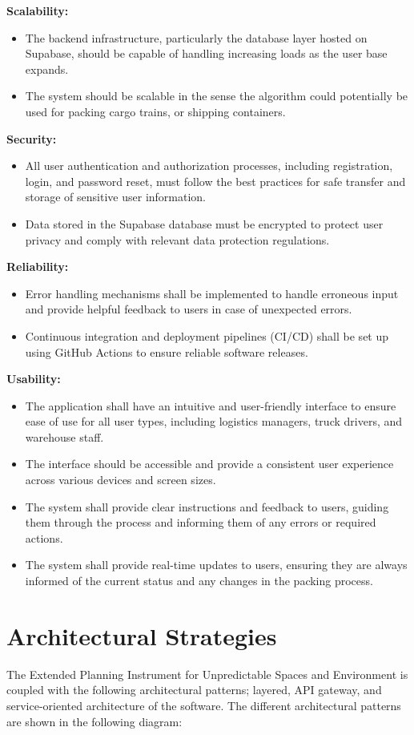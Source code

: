 \documentclass{article}
\begin{document}
\textbf{Scalability:}
\begin{itemize}
    \item The backend infrastructure, particularly the database layer hosted on Supabase, should be capable of handling increasing loads as the user base expands.
    \item The system should be scalable in the sense the algorithm could potentially be used for packing cargo trains, or shipping containers.
\end{itemize}

\textbf{Security:}
\begin{itemize}
    \item All user authentication and authorization processes, including registration, login, and password reset, must follow the best practices for safe transfer and storage of sensitive user information.
    \item Data stored in the Supabase database must be encrypted to protect user privacy and comply with relevant data protection regulations.
\end{itemize}

\textbf{Reliability:}
\begin{itemize}
    \item Error handling mechanisms shall be implemented to handle erroneous input and provide helpful feedback to users in case of unexpected errors.
    \item Continuous integration and deployment pipelines (CI/CD) shall be set up using GitHub Actions to ensure reliable software releases.
\end{itemize}

\textbf{Usability:}
\begin{itemize}
    \item The application shall have an intuitive and user-friendly interface to ensure ease of use for all user types, including logistics managers, truck drivers, and warehouse staff.
    \item The interface should be accessible and provide a consistent user experience across various devices and screen sizes.
    \item The system shall provide clear instructions and feedback to users, guiding them through the process and informing them of any errors or required actions.
    \item The system shall provide real-time updates to users, ensuring they are always informed of the current status and any changes in the packing process.
\end{itemize}

\section{Architectural Strategies}
The Extended Planning Instrument for Unpredictable Spaces and Environment is coupled with the following architectural patterns; layered, API gateway, and service-oriented architecture of the software. The different architectural patterns are shown in the following diagram:
\end{document}
